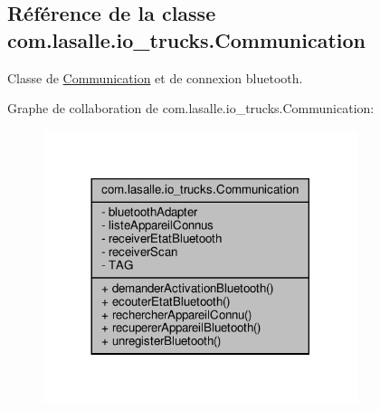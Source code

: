 \hypertarget{classcom_1_1lasalle_1_1io__trucks_1_1_communication}{}\subsection{Référence de la classe com.\+lasalle.\+io\+\_\+trucks.\+Communication}
\label{classcom_1_1lasalle_1_1io__trucks_1_1_communication}


Classe de \hyperlink{classcom_1_1lasalle_1_1io__trucks_1_1_communication}{Communication} et de connexion bluetooth.  




Graphe de collaboration de com.\+lasalle.\+io\+\_\+trucks.\+Communication\+:
\nopagebreak
\begin{figure}[H]
\begin{center}
\leavevmode
\includegraphics[width=260pt]{classcom_1_1lasalle_1_1io__trucks_1_1_communication__coll__graph}
\end{center}
\end{figure}

